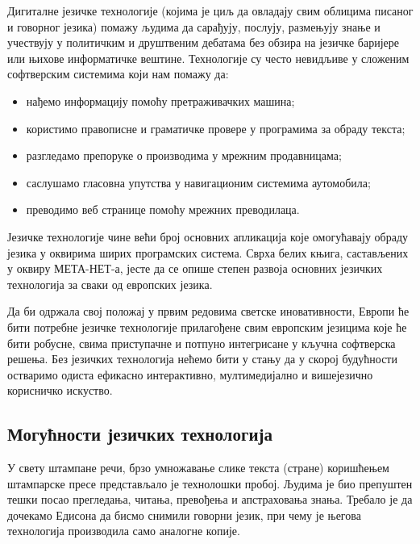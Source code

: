 \begin{multicols}{2}
Дигиталне језичке технологије (којима је циљ да овладају свим облицима писаног и говорног језика) помажу људима да сарађују, послују, размењују знање и учествују у политичким и друштвеним дебатама без обзира на језичке баријере или њихове информатичке вештине. Технологије су често невидљиве у сложеним софтверским системима који нам помажу да:

\begin{itemize}
\item нађемо информацију помоћу претраживачких машина;
\item користимо правописне и граматичке провере у програмима за о\-бра\-ду текста;
\item разгледамо препоруке о производима у мрежним продавницама;
\item саслушамо гласовна упутства у навигационим системима аутомобила;
\item преводимо веб странице помоћу мрежних преводилаца.
\end{itemize}

Језичке технологије чине већи број основних апликација које омогућавају обраду језика у оквирима ширих програмских система. Сврха белих књига, састављених у оквиру МЕТА-НЕТ-а, јесте да се опише степен развоја основних језичких технологија за сваки од европских језика. 


Да би одржала свој положај у првим редовима светске иновативности, Европи ће бити потребне језичке технологије прилагођене свим европским језицима које ће бити робусне, свима приступачне и потпуно интегрисане у кључна софтверска решења. Без језичких технологија нећемо бити у стању да у скорој будућности остваримо одиста ефикасно интерактивно, мултимедијално и вишејезично корисничко искуство.

\subsection {Могућности језичких технологија}
  

У свету штампане речи, брзо умножавање слике текста (стране) коришћењем штампарске пресе пред\-став\-ља\-ло је технолошки пробој. Људима је био препуштен тешки посао прегледања, читања, превођења и апстраховања знања. Требало је да дочекамо Едисона да бисмо снимили говорни језик, при чему је његова технологија производила само аналогне копије.


\end{multicols}
